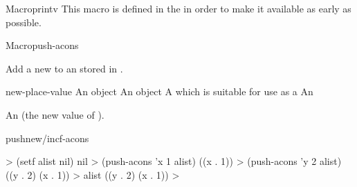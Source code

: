 \documentclass[10pt,twoside,english,pdftex]{article}
\begin{document}
\begin{functiondoc}{Macro}{printv}{%
    }
\fnnote
{}%
%
%
This macro is defined in the  
in order to make it available as early as possible.

\end{functiondoc}


\begin{functiondoc}{Macro}{push-acons}{
    }
%
%
  
\fnsyntax

\fnpurpose Add a new   to an
 stored in .

\fnpackage {}

\fnmodule {}

\fnargs
\begin{args}{new-place-value}
\arg[item] An object
\arg[value] An object
\arg[place] A  which is suitable for use as a
 An 
\end{args}

\fnreturns An  (the new value of
). 

\begin{alsos}{pushnew/incf-acons}
\end{alsos}

\fnexamples
%
\W\supp
\begin{example}
  > (setf alist nil)
  nil
  > (push-acons 'x 1 alist)
  ((x . 1))\goodpagebreak
  > (push-acons 'y 2 alist)
  ((y . 2) (x . 1))
  > alist
  ((y . 2) (x . 1))
  >
\end{example}

\end{functiondoc}

\end{document}
